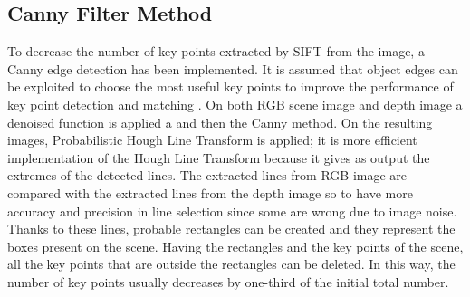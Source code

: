 \documentclass{article}
\begin{document}
\subsection{Canny Filter Method}
\label{canny_filter}
To decrease the number of key points extracted by SIFT from the image, a Canny edge detection has been implemented. It is assumed that object edges can be exploited to choose the most useful key points to improve the performance of key point detection and matching \cite{matusiak_skulimowski_strumillo_2018}.
On both RGB scene image and depth image a denoised function is applied a and then the Canny method. On the resulting images, Probabilistic Hough Line Transform is applied; it is more efficient implementation of the Hough Line Transform because it gives as output the extremes of the detected lines. The extracted lines from RGB image are compared with the extracted lines from the depth image so to have more accuracy and precision in line selection since some are wrong due to image noise. Thanks to these lines, probable rectangles can be created and they represent the boxes present on the scene. Having the rectangles and the key points of the scene, all the key points that are outside the rectangles can be deleted. In this way, the number of key points usually decreases by one-third of the initial total number.
\end{document}
